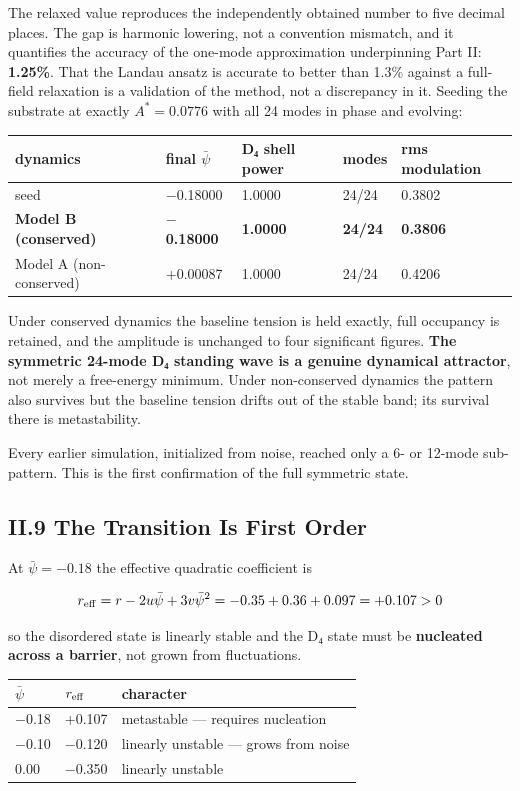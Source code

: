\documentclass[a4paper,11pt]{article}
\begin{document}
The relaxed value reproduces the independently obtained number to five decimal places. The gap is harmonic lowering, not a convention mismatch, and it quantifies the accuracy of the one-mode approximation underpinning Part II: \textbf{1.25\%}. That the Landau ansatz is accurate to better than 1.3\% against a full-field relaxation is a validation of the method, not a discrepancy in it. Seeding the substrate at exactly $A^*=0.0776$ with all 24 modes in phase and evolving:

\begin{center}
\begin{tabular}{lllll}
\hline
dynamics & final $\bar\psi$ & D₄ shell power & modes & rms modulation \\
\hline
seed & $-$0.18000 & 1.0000 & 24/24 & 0.3802 \\
\textbf{Model B (conserved)} & \textbf{$-$0.18000} & \textbf{1.0000} & \textbf{24/24} & \textbf{0.3806} \\
Model A (non-conserved) & +0.00087 & 1.0000 & 24/24 & 0.4206 \\
\hline
\end{tabular}
\end{center}

Under conserved dynamics the baseline tension is held exactly, full occupancy is retained, and the amplitude is unchanged to four significant figures. \textbf{The symmetric 24-mode D₄ standing wave is a genuine dynamical attractor}, not merely a free-energy minimum. Under non-conserved dynamics the pattern also survives but the baseline tension drifts out of the stable band; its survival there is metastability.

Every earlier simulation, initialized from noise, reached only a 6- or 12-mode sub-pattern. This is the first confirmation of the full symmetric state.

\subsection*{II.9 The Transition Is First Order}

At $\bar\psi=-0.18$ the effective quadratic coefficient is

\[r_{\rm eff}=r-2u\bar\psi+3v\bar\psi^2=-0.35+0.36+0.097=+0.107>0\]

so the disordered state is linearly stable and the D₄ state must be \textbf{nucleated across a barrier}, not grown from fluctuations.

\begin{center}
\begin{tabular}{lll}
\hline
$\bar\psi$ & $r_{\rm eff}$ & character \\
\hline
$-$0.18 & +0.107 & metastable — requires nucleation \\
$-$0.10 & $-$0.120 & linearly unstable — grows from noise \\
0.00 & $-$0.350 & linearly unstable \\
\hline
\end{tabular}
\end{center}
\end{document}
